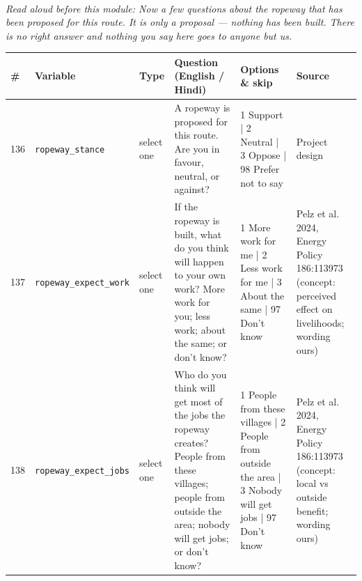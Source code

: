 \documentclass[9pt,a4paper,landscape]{article}
\begin{document}
\\[3pt]
{\small\itshape Read aloud before this module: Now a few questions about the ropeway that has been proposed for this route. It is only a proposal — nothing has been built. There is no right answer and nothing you say here goes to anyone but us.}\\[5pt]
\begin{longtable}{@{}p{0.5cm}p{3.3cm}p{1.7cm}p{7.3cm}p{5.6cm}p{5.4cm}@{}}
\toprule \footnotesize\textbf{\#} & \footnotesize\textbf{Variable} & \footnotesize\textbf{Type} & \footnotesize\textbf{Question (English / Hindi)} & \footnotesize\textbf{Options {\&} skip} & \footnotesize\textbf{Source}\\ \midrule
\endhead
\footnotesize 136 & \footnotesize\texttt{ropeway\_stance} & \scriptsize select one & \footnotesize A ropeway is proposed for this route. Are you in favour, neutral, or against?\par\vspace{1pt}{\footnotesize\color{hdr}{\hifont गौरीकुंड से केदारनाथ तक रोपवे बनाने की बात चल रही है। आप इसके पक्ष में हैं, बीच में हैं, या ख़िलाफ़ हैं?}} & \scriptsize 1 Support | 2 Neutral | 3 Oppose | 98 Prefer not to say & \scriptsize Project design\\
\footnotesize 137 & \footnotesize\texttt{ropeway\_expect\_work} & \scriptsize select one & \footnotesize If the ropeway is built, what do you think will happen to your own work? More work for you; less work; about the same; or don't know?\par\vspace{1pt}{\footnotesize\color{hdr}{\hifont अगर रोपवे बन गया, तो आपके अपने काम पर क्या असर होगा? मेरे लिए ज़्यादा काम; मेरे लिए कम काम; लगभग वैसा ही; या पता नहीं?}} & \scriptsize 1 More work for me | 2 Less work for me | 3 About the same | 97 Don't know & \scriptsize Pelz et al. 2024, Energy Policy 186:113973 (concept: perceived effect on livelihoods; wording ours)\\
\footnotesize 138 & \footnotesize\texttt{ropeway\_expect\_jobs} & \scriptsize select one & \footnotesize Who do you think will get most of the jobs the ropeway creates? People from these villages; people from outside the area; nobody will get jobs; or don't know?\par\vspace{1pt}{\footnotesize\color{hdr}{\hifont रोपवे में जो नौकरियाँ बनेंगी, वे ज़्यादातर किसे मिलेंगी? इन गाँवों के लोगों को; इलाके के बाहर के लोगों को; किसी को नहीं मिलेंगी; या पता नहीं?}} & \scriptsize 1 People from these villages | 2 People from outside the area | 3 Nobody will get jobs | 97 Don't know & \scriptsize Pelz et al. 2024, Energy Policy 186:113973 (concept: local vs outside benefit; wording ours)\\

\end{longtable}
\end{document}
